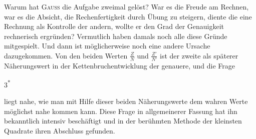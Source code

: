 Warum hat \textsc{Gauss} die Aufgabe zweimal gelöst? War es die Freude am
Rechnen, war es die Absicht, die Rechenfertigkeit durch Übung zu steigern,
diente die eine Rechnung als Kontrolle der andern, wollte er den Grad der
Genauigkeit rechnerisch ergründen? Vermutlich haben damals noch alle diese
Gründe mitgespielt. Und dann ist möglicherweise noch eine andere Ursache
dazugekommen. Von den beiden Werten $\frac{Z}{N}$ und $\frac{Z'}{N'}$ ist der zweite als späterer
Näherungswert in der Kettenbruchentwicklung der genauere, und die Frage
\par\smallskip\noindent\hfill{\small 3\textsuperscript{*}}\par
\clearpage{}
\noindent liegt nahe, wie man mit Hilfe dieser beiden Näherungswerte dem wahren
Werte möglichst nahe kommen kann. Diese Frage in allgemeinerer Fassung
hat ihn bekanntlich intensiv beschäftigt und in der berühmten Methode der
kleinsten Quadrate ihren Abschluss gefunden.
\par\clearpage\endgroup
